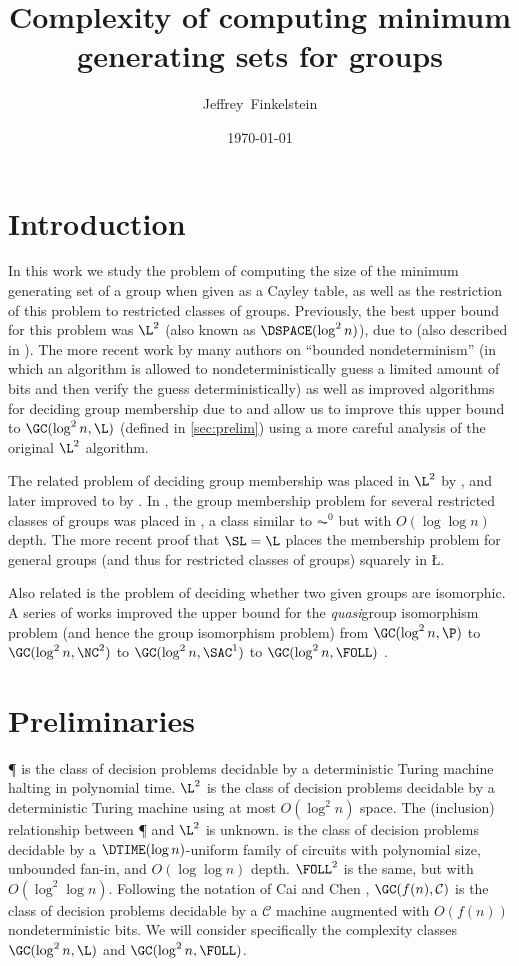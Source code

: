 \documentclass{article}
\title{Complexity of computing minimum generating sets for groups}
\author{Jef{}frey~Finkelstein}
\date{\today}
\begin{document}
\maketitle

\section{Introduction}

In this work we study the problem of computing the size of the minimum generating set of a group when given as a Cayley table, as well as the restriction of this problem to restricted classes of groups.
Previously, the best upper bound for this problem was $\L^2$ (also known as $\DSPACE(\log^2 n)$), due to \cite{lsz77} (also described in \cite[Proposition~3]{at06}).
The more recent work by many authors on ``bounded nondeterminism'' (in which an algorithm is allowed to nondeterministically guess a limited amount of bits and then verify the guess deterministically) as well as improved algorithms for deciding group membership due to \cite{bm89} and \cite{bklm01} allow us to improve this upper bound to $\GC(\log^2 n, \L)$ (defined in \autoref{sec:prelim}) using a more careful analysis of the original $\L^2$ algorithm.

The related problem of deciding group membership was placed in $\L^2$ by \cite{lsz77}, and later improved to \SL{} by \cite{bm89}.
In \cite{bklm01}, the group membership problem for several restricted classes of groups was placed in \FOLL, a class similar to $\AC^0$ but with $O(\log \log n)$ depth.
The more recent proof that $\SL = \L$ \cite{reingold08} places the membership problem for general groups (and thus for restricted classes of groups) squarely in \L.

Also related is the problem of deciding whether two given groups are isomorphic.
A series of works improved the upper bound for the \emph{quasi}group isomorphism problem (and hence the group isomorphism problem) from $\GC(\log^2 n, \P)$ \cite{py96} to $\GC(\log^2 n, \NC^2)$ \cite{wolf94} to $\GC(\log^2 n, \SAC^1)$ \cite{wagner10} to $\GC(\log^2 n, \FOLL)$ \cite{ctw10}.

\section{Preliminaries}\label{sec:prelim}

\P{} is the class of decision problems decidable by a deterministic Turing machine halting in polynomial time.
$\L^2$ is the class of decision problems decidable by a deterministic Turing machine using at most $O(\log^2 n)$ space.
The (inclusion) relationship between \P{} and $\L^2$ is unknown.
\FOLL{} is the class of decision problems decidable by a $\DTIME(\log n)$-uniform family of circuits with polynomial size, unbounded fan-in, and $O(\log \log n)$ depth.
$\FOLL^2$ is the same, but with $O(\log^2 \log n)$.
Following the notation of Cai and Chen \cite{cc97}, $\GC(f(n), \mathcal{C})$ is the class of decision problems decidable by a $\mathcal{C}$ machine augmented with $O(f(n))$ nondeterministic bits.
We will consider specifically the complexity classes $\GC(\log^2 n, \L)$ and $\GC(\log^2 n, \FOLL)$.
\end{document}
